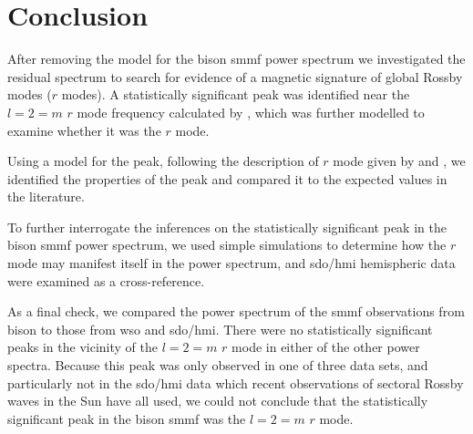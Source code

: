 \section{Conclusion}\label{sec:r-mode_conclusion}

After removing the model for the \gls{bison} \gls{smmf} power spectrum we investigated the residual spectrum to search for evidence of a magnetic signature of global Rossby modes ($r$ modes). A statistically significant peak was identified near the $l=2=m$ $r$ mode frequency calculated by \citet{lanza_sectoral_2019}, which was further modelled to examine whether it was the $r$ mode.

Using a model for the peak, following the description of $r$ mode given by \citet{loptien_global-scale_2018} and \citet{liang_time-distance_2019}, we identified the properties of the peak and compared it to the expected values in the literature. %

To further interrogate the inferences on the statistically significant peak in the \gls{bison} \gls{smmf} power spectrum, we used simple simulations to determine how the $r$ mode may manifest itself in the power spectrum, and \gls{sdo/hmi} hemispheric data were examined as a cross-reference.

As a final check, we compared the power spectrum of the \gls{smmf} observations from \gls{bison} to those from \gls{wso} and \gls{sdo/hmi}. There were no statistically significant peaks in the vicinity of the $l=2=m$ $r$ mode in either of the other power spectra. Because this peak was only observed in one of three data sets, and particularly not in the \gls{sdo/hmi} data which recent observations of sectoral Rossby waves in the Sun have all used, we could not conclude that the statistically significant peak in the \gls{bison} \gls{smmf} was the $l=2=m$ $r$ mode.

